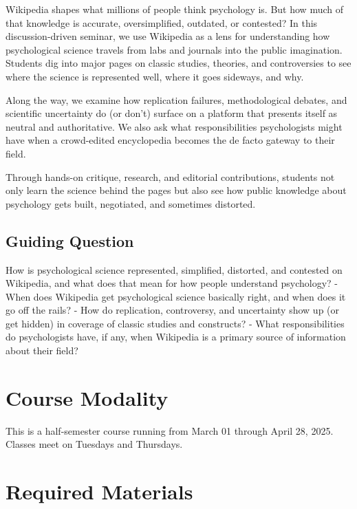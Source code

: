 \documentclass[
]{book}
\begin{document}
Wikipedia shapes what millions of people think psychology is. But how much of that knowledge is accurate, oversimplified, outdated, or contested? In this discussion-driven seminar, we use Wikipedia as a lens for understanding how psychological science travels from labs and journals into the public imagination. Students dig into major pages on classic studies, theories, and controversies to see where the science is represented well, where it goes sideways, and why.

Along the way, we examine how replication failures, methodological debates, and scientific uncertainty do (or don't) surface on a platform that presents itself as neutral and authoritative. We also ask what responsibilities psychologists might have when a crowd-edited encyclopedia becomes the de facto gateway to their field.

Through hands-on critique, research, and editorial contributions, students not only learn the science behind the pages but also see how public knowledge about psychology gets built, negotiated, and sometimes distorted.

\subsection*{Guiding Question}\label{guiding-question}


How is psychological science represented, simplified, distorted, and contested on Wikipedia, and what does that mean for how people understand psychology?
- When does Wikipedia get psychological science basically right, and when does it go off the rails?
- How do replication, controversy, and uncertainty show up (or get hidden) in coverage of classic studies and constructs?
- What responsibilities do psychologists have, if any, when Wikipedia is a primary source of information about their field?

\section*{Course Modality}\label{course-modality}


This is a half-semester course running from March 01 through April 28, 2025. Classes meet on Tuesdays and Thursdays.

\section*{Required Materials}\label{required-materials-3}
\end{document}
